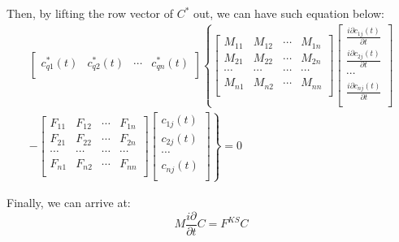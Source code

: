 Then, by lifting the row vector of $C^{*}$ out, we can have such
equation below:
\begin{multline}\label{TDDFTeq:3}
\begin{bmatrix}
c_{q1}^{*}(t) & c_{q2}^{*}(t) &  \cdots   & c_{qn}^{*}(t) \\
\end{bmatrix}
\left\{
\begin{bmatrix}
     M_{11} & M_{12} & \cdots & M_{1n} \\
     M_{21} & M_{22} & \cdots & M_{2n} \\
     \cdots & \cdots & \cdots & \cdots \\
     M_{n1} & M_{n2} & \cdots & M_{nn} \\
   \end{bmatrix}
\begin{bmatrix}
  \frac{i\partial c_{1j}(t)}{\partial t} \\
  \frac{i\partial c_{2j}(t)}{\partial t} \\
  \cdots \\
  \frac{i\partial c_{nj}(t)}{\partial t} \\
\end{bmatrix}
\right. \\
\left. -
\begin{bmatrix}
     F_{11} & F_{12} & \cdots & F_{1n} \\
     F_{21} & F_{22} & \cdots & F_{2n} \\
     \cdots & \cdots & \cdots & \cdots \\
     F_{n1} & F_{n2} & \cdots & F_{nn} \\
   \end{bmatrix}
\begin{bmatrix}
  c_{1j}(t) \\
  c_{2j}(t) \\
  \cdots \\
  c_{nj}(t) \\
\end{bmatrix}
 \right\}
= 0
\end{multline}

Finally, we can arrive at:
\begin{equation}\label{}
M\frac{i\partial}{\partial t}C = F^{KS}C
\end{equation}

